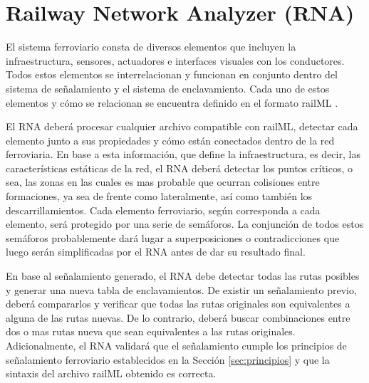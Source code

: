 \chapter{Railway Network Analyzer (RNA)}
    \label{sec:RNA}

    El sistema ferroviario consta de diversos elementos que incluyen la infraestructura, sensores, actuadores  e interfaces visuales con los conductores. Todos estos elementos se interrelacionan y funcionan en conjunto dentro del sistema de señalamiento y el sistema de enclavamiento. Cada uno de estos elementos y cómo se relacionan se encuentra definido en el formato railML \cite{RAILML_0,Paper_109,Paper_107,Paper_112,Paper_150,Paper_159}. 

    El RNA deberá procesar cualquier archivo compatible con railML, detectar cada elemento junto a sus propiedades y cómo están conectados dentro de la red ferroviaria. En base a esta información, que define la infraestructura, es decir, las características estáticas de la red, el RNA deberá detectar los puntos críticos, o sea, las zonas en las cuales es mas probable que ocurran colisiones entre formaciones, ya sea de frente como lateralmente, así como también los descarrillamientos. Cada elemento ferroviario, según corresponda a cada elemento, será protegido por una serie de semáforos. La conjunción de todos estos semáforos probablemente dará lugar a superposiciones o contradicciones que luego serán simplificadas por el RNA antes de dar su resultado final.

    En base al señalamiento generado, el RNA debe detectar todas las rutas posibles y generar una nueva tabla de enclavamientos. De existir un señalamiento previo, deberá compararlos y verificar que todas las rutas originales son equivalentes a alguna de las rutas nuevas. De lo contrario, deberá buscar combinaciones entre dos o mas rutas nueva que sean equivalentes a las rutas originales. Adicionalmente, el RNA validará que el señalamiento cumple los principios de señalamiento ferroviario establecidos en la Sección \ref{sec:principios} y que la sintaxis del archivo railML obtenido es correcta.    

    
    
    
    
    
    